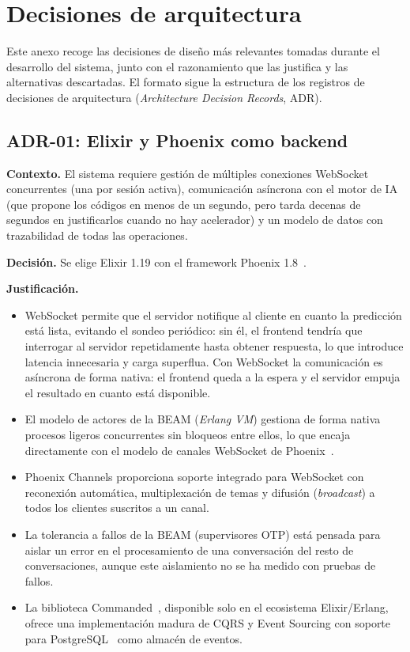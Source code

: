 \chapter{Decisiones de arquitectura}
\label{cap:AnexoE}

Este anexo recoge las decisiones de diseño más relevantes tomadas durante el desarrollo del sistema, junto con el razonamiento que las justifica y las alternativas descartadas. El formato sigue la estructura de los registros de decisiones de arquitectura (\emph{Architecture Decision Records}, ADR).

\section{ADR-01: Elixir y Phoenix como backend}

\textbf{Contexto.} El sistema requiere gestión de múltiples conexiones WebSocket concurrentes (una por sesión activa), comunicación asíncrona con el motor de IA (que propone los códigos en menos de un segundo, pero tarda decenas de segundos en justificarlos cuando no hay acelerador) y un modelo de datos con trazabilidad de todas las operaciones.

\textbf{Decisión.} Se elige Elixir 1.19 con el framework Phoenix 1.8~\cite{phoenix2024}.

\textbf{Justificación.}
\begin{itemize}
    \item WebSocket permite que el servidor notifique al cliente en cuanto la predicción está lista, evitando el sondeo periódico: sin él, el frontend tendría que interrogar al servidor repetidamente hasta obtener respuesta, lo que introduce latencia innecesaria y carga superflua. Con WebSocket la comunicación es asíncrona de forma nativa: el frontend queda a la espera y el servidor empuja el resultado en cuanto está disponible.
    \item El modelo de actores de la BEAM (\emph{Erlang VM}) gestiona de forma nativa procesos ligeros concurrentes sin bloqueos entre ellos, lo que encaja directamente con el modelo de canales WebSocket de Phoenix~\cite{phoenix2024}.
    \item Phoenix Channels proporciona soporte integrado para WebSocket con reconexión automática, multiplexación de temas y difusión (\emph{broadcast}) a todos los clientes suscritos a un canal.
    \item La tolerancia a fallos de la BEAM (supervisores OTP) está pensada para aislar un error en el procesamiento de una conversación del resto de conversaciones, aunque este aislamiento no se ha medido con pruebas de fallos.
    \item La biblioteca Commanded~\cite{commanded2024}, disponible solo en el ecosistema Elixir/Erlang, ofrece una implementación madura de CQRS y Event Sourcing con soporte para PostgreSQL~\cite{postgresql2024} como almacén de eventos.
\end{itemize}

